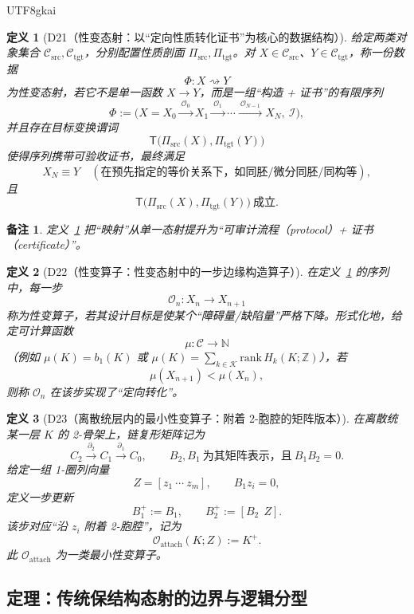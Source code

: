 \documentclass[12pt]{article}
\newtheorem{definition}{定义}[section]
\newtheorem{remark}{备注}[section]
\begin{document}
\begin{CJK*}{UTF8}{gkai}
\begin{definition}[D21（性变态射：以“定向性质转化证书”为核心的数据结构）]
\label{def:D21}
给定两类对象集合 $\mathcal C_{\mathrm{src}},\mathcal C_{\mathrm{tgt}}$，分别配置性质剖面 $\Pi_{\mathrm{src}},\Pi_{\mathrm{tgt}}$。对
  $X\in\mathcal C_{\mathrm{src}}$、$Y\in\mathcal C_{\mathrm{tgt}}$，称一份数据
\[
\Phi: X \rightsquigarrow Y
\]
为\emph{性变态射}，若它不是单一函数 $X\to Y$，而是一组“构造 + 证书”的有限序列
\[
\Phi := \big( X=X_0 \xrightarrow{\ \mathcal O_0\ } X_1 \xrightarrow{\ \mathcal O_1\ } \cdots \xrightarrow{\ \mathcal
  O_{N-1}\ } X_N,\ \mathcal I \big),
\]
并且存在目标变换谓词
\[
\mathsf T\big(\Pi_{\mathrm{src}}(X),\Pi_{\mathrm{tgt}}(Y)\big)
\]
使得序列携带可验收证书，最终满足
\[
X_N\equiv Y
\quad
(\text{在预先指定的等价关系下，如同胚/微分同胚/同构等}),
\]
且
\[
\mathsf T\big(\Pi_{\mathrm{src}}(X),\Pi_{\mathrm{tgt}}(Y)\big)\ \text{成立}.
\]
\end{definition}

\begin{remark}
定义~\ref{def:D21} 把“映射”从单一态射提升为“可审计流程（protocol）+ 证书（certificate）”。
\end{remark}

\begin{definition}[D22（性变算子：性变态射中的一步边缘构造算子）]
\label{def:D22}
在定义~\ref{def:D21} 的序列中，每一步
\[
\mathcal O_n: X_n \to X_{n+1}
\]
称为\emph{性变算子}，若其设计目标是使某个“障碍量/缺陷量”严格下降。形式化地，给定可计算函数
\[
\mu:\mathcal C\to \mathbb N
\]
（例如 $\mu(K)=b_1(K)$ 或 $\mu(K)=\sum_{k\in\mathcal K}\mathrm{rank}\,H_k(K;\mathbb Z)$），若
\[
\mu(X_{n+1})<\mu(X_n),
\]
则称 $\mathcal O_n$ 在该步实现了“定向转化”。
\end{definition}

\begin{definition}[D23（离散统层内的最小性变算子：附着 2-胞腔的矩阵版本）]
\label{def:D23}
在离散统某一层 $K$ 的 2-骨架上，链复形矩阵记为
\[
C_2 \xrightarrow{\ \partial_2\ } C_1 \xrightarrow{\ \partial_1\ } C_0,
\qquad
B_2,B_1\ \text{为其矩阵表示，且}\ B_1B_2=0.
\]
给定一组 1-圈列向量
\[
Z=[z_1\ \cdots\ z_m],\qquad B_1z_i=0,
\]
定义一步更新
\[
B_1^+:=B_1,\qquad B_2^+:=[B_2\ \ Z].
\]
该步对应“沿 $z_i$ 附着 2-胞腔”，记为
\[
\mathcal O_{\mathrm{attach}}(K;Z):=K^+.
\]
此 $\mathcal O_{\mathrm{attach}}$ 为一类最小性变算子。
\end{definition}

\subsection{定理：传统保结构态射的边界与逻辑分型}


\end{CJK*}
\end{document}
